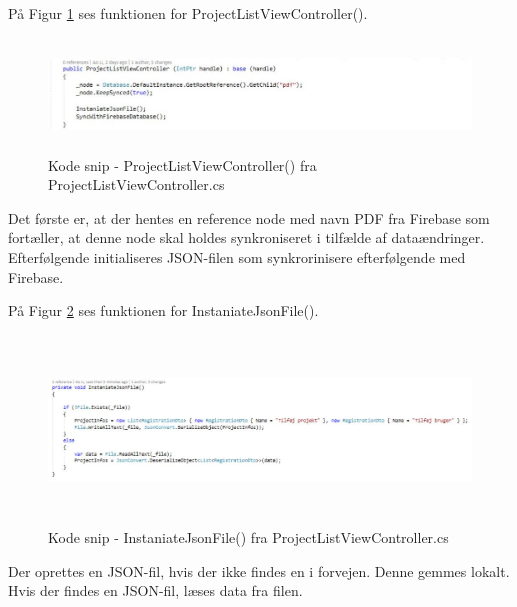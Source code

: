 På Figur \ref{fig:ProjectListViewController} ses funktionen for ProjectListViewController().
\begin{figure}[H] %
	\centering
	\includegraphics[height=3cm, width=17cm]{../ArkitekturDesign/Design/ProjectList/ProjectListViewController}
	\caption{Kode snip - ProjectListViewController() fra ProjectListViewController.cs}
	\label{fig:ProjectListViewController}
\end{figure}
Det første er, at der hentes en reference node med navn PDF fra Firebase som fortæller, at denne node skal holdes synkroniseret i tilfælde af dataændringer. \\
Efterfølgende initialiseres JSON-filen som synkrorinisere efterfølgende med Firebase.

På Figur \ref{fig:JSONFile} ses funktionen for InstaniateJsonFile().
\begin{figure}[H] %
	\centering
	\includegraphics[height=5cm, width=15cm]{../ArkitekturDesign/Design/ProjectList/JSONFile}
	\caption{Kode snip - InstaniateJsonFile() fra ProjectListViewController.cs}
	\label{fig:JSONFile}
\end{figure}
Der oprettes en JSON-fil, hvis der ikke findes en i forvejen. Denne gemmes lokalt.\\
Hvis der findes en JSON-fil, læses data fra filen.

\clearpage

